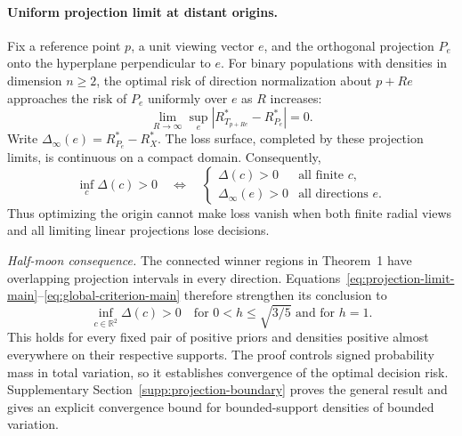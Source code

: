 \paragraph{Uniform projection limit at distant origins.}
Fix a reference point \(p\), a unit viewing vector \(e\), and the orthogonal projection \(P_e\) onto the hyperplane perpendicular to \(e\). For binary populations with densities in dimension \(n\geq2\), the optimal risk of direction normalization about \(p+Re\) approaches the risk of \(P_e\) uniformly over \(e\) as \(R\) increases:
\begin{equation}
 \lim_{R\to\infty}\sup_e
 \left|R^*_{T_{p+Re}}-R^*_{P_e}\right|=0.
 \label{eq:projection-limit-main}
\end{equation}
Write $\Delta_\infty(e)=R^*_{P_e}-R_X^*$. The loss surface, completed by these projection limits, is continuous on a compact domain. Consequently,
\begin{equation}
 \inf_c\Delta(c)>0
 \quad\Longleftrightarrow\quad
 \begin{cases}
 \Delta(c)>0&\text{all finite }c,\\
 \Delta_\infty(e)>0&\text{all directions }e.
 \end{cases}
 \label{eq:global-criterion-main}
\end{equation}
Thus optimizing the origin cannot make loss vanish when both finite radial views and all limiting linear projections lose decisions.

\emph{Half-moon consequence.}
The connected winner regions in Theorem~1 have overlapping projection intervals in every direction. Equations~\eqref{eq:projection-limit-main}--\eqref{eq:global-criterion-main} therefore strengthen its conclusion to
\begin{equation}
 \inf_{c\in\mathbb R^2}\Delta(c)>0
 \quad\text{for }0<h\leq\sqrt{3/5}\text{ and for }h=1.
 \label{eq:global-positive}
\end{equation}
This holds for every fixed pair of positive priors and densities positive almost everywhere on their respective supports. The proof controls signed probability mass in total variation, so it establishes convergence of the optimal decision risk. Supplementary Section~\ref{supp:projection-boundary} proves the general result and gives an explicit convergence bound for bounded-support densities of bounded variation.

